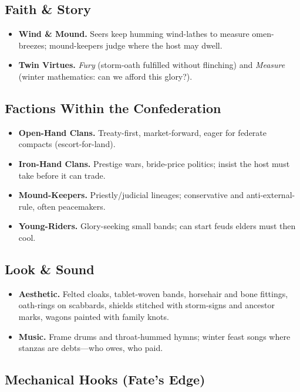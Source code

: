 \documentclass[11pt,letterpaper]{article}
\begin{document}
\subsection*{Faith \& Story}
\begin{itemize}
  \item \textbf{Wind \& Mound.} Seers keep humming wind-lathes to measure omen-breezes; mound-keepers judge where the host may dwell.
  \item \textbf{Twin Virtues.} \emph{Fury} (storm-oath fulfilled without flinching) and \emph{Measure} (winter mathematics: can we afford this glory?).
\end{itemize}

\subsection*{Factions Within the Confederation}
\begin{itemize}
  \item \textbf{Open-Hand Clans.} Treaty-first, market-forward, eager for federate compacts (escort-for-land).
  \item \textbf{Iron-Hand Clans.} Prestige wars, bride-price politics; insist the host must take before it can trade.
  \item \textbf{Mound-Keepers.} Priestly/judicial lineages; conservative and anti-external-rule, often peacemakers.
  \item \textbf{Young-Riders.} Glory-seeking small bands; can start feuds elders must then cool.
\end{itemize}

\subsection*{Look \& Sound}
\begin{itemize}
  \item \textbf{Aesthetic.} Felted cloaks, tablet-woven bands, horsehair and bone fittings, oath-rings on scabbards, shields stitched with storm-signs and ancestor marks, wagons painted with family knots.
  \item \textbf{Music.} Frame drums and throat-hummed hymns; winter feast songs where stanzas are debts---who owes, who paid.
\end{itemize}

\subsection*{Mechanical Hooks (Fate's Edge)}
\end{document}
